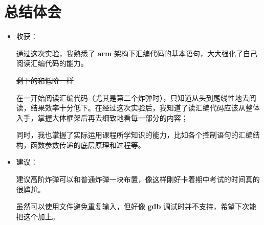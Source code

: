 \section{总结体会}
    \begin{itemize}
        \item 收获：
            \par 通过这次实验，我熟悉了 \textbf{arm} 架构下汇编代码的基本语句，大大强化了自己阅读汇编代码的能力。
            \par \sout{剩下的和低阶一样}
            \par 在一开始阅读汇编代码（尤其是第二个炸弹时），只知道从头到尾线性地去阅读，结果效率十分低下。在经过这次实验后，我知道了读汇编代码应该从整体入手，掌握大体框架后再去细致地看每一部分的内容；
            \par 同时，我也掌握了实际运用课程所学知识的能力，比如各个控制语句的汇编结构，函数参数传递的底层原理和过程等。
        \item 建议：
            \par 建议高阶炸弹可以和普通炸弹一块布置，像这样刚好卡着期中考试的时间真的很尴尬。
            \par 虽然可以使用文件避免重复输入，但好像 \textbf{gdb} 调试时并不支持，希望下次能把这个加上。

    \end{itemize} 